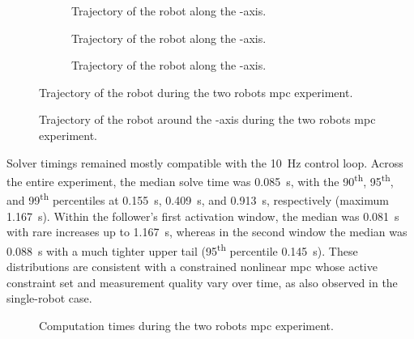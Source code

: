 \begin{figure}
	\centering
	\begin{subfigure}{\figurewidth}
		\centering
		\caption{Trajectory of the robot along the -axis.}
		\label{e_rcce_r_mpc_2_follower_pose_x}
	\end{subfigure}
	\begin{subfigure}{\figurewidth}
		\centering
		\caption{Trajectory of the robot along the -axis.}
		\label{e_rcce_r_mpc_2_follower_pose_y}
	\end{subfigure}
	\begin{subfigure}{\figurewidth}
		\centering
		\caption{Trajectory of the robot along the -axis.}
		\label{e_rcce_r_mpc_2_follower_pose_z}
	\end{subfigure}
	\caption{Trajectory of the robot during the two robots \ac{mpc} experiment.}
	\label{e_rcce_r_mpc_2_follower_poses}
\end{figure}

\begin{figure}
	\centering
	\caption{Trajectory of the robot around the -axis during the two robots \ac{mpc} experiment.}
	\label{e_rcce_r_mpc_2_follower_pose_wz}
\end{figure}

Solver timings remained mostly compatible with the \qty{10}{\Hz} control loop. Across the entire
experiment, the median solve time was \qty{0.085}{\s}, with the \num{90}\textsuperscript{th},
\num{95}\textsuperscript{th}, and \num{99}\textsuperscript{th} percentiles at \qty{0.155}{\s},
\qty{0.409}{\s}, and \qty{0.913}{\s}, respectively (maximum \qty{1.167}{\s}). Within the follower's
first activation window, the median was \qty{0.081}{\s} with rare increases up to \qty{1.167}{\s},
whereas in the second window the median was \qty{0.088}{\s} with a much tighter upper tail
(\num{95}\textsuperscript{th} percentile \qty{0.145}{\s}). These distributions are consistent with
a constrained nonlinear \ac{mpc} whose active constraint set and measurement quality vary over
time, as also observed in the single-robot case.

\begin{figure}
	\centering
	\caption{Computation times during the two robots \ac{mpc} experiment.}
	\label{e_rcce_r_mpc_2_compute_time}
\end{figure}

